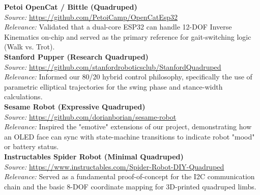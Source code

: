 \documentclass{article}
\begin{document}
\textbf{Petoi OpenCat / Bittle (Quadruped)} \\
\textit{Source:} \url{https://github.com/PetoiCamp/OpenCatEsp32} \\
\textit{Relevance:} Validated that a dual-core ESP32 can handle 12-DOF Inverse Kinematics on-chip and served as the primary reference for gait-switching logic (Walk vs. Trot). \\

\textbf{Stanford Pupper (Research Quadruped)} \\
\textit{Source:} \url{https://github.com/stanfordroboticsclub/StanfordQuadruped} \\
\textit{Relevance:} Informed our 80/20 hybrid control philosophy, specifically the use of parametric elliptical trajectories for the swing phase and stance-width calculations. \\

\textbf{Sesame Robot (Expressive Quadruped)} \\
\textit{Source:} \url{https://github.com/dorianborian/sesame-robot} \\
\textit{Relevance:} Inspired the "emotive" extensions of our project, demonstrating how an OLED face can sync with state-machine transitions to indicate robot "mood" or battery status. \\

\textbf{Instructables Spider Robot (Minimal Quadruped)} \\
\textit{Source:} \url{https://www.instructables.com/Spider-Robot-DIY-Quadruped} \\
\textit{Relevance:} Served as a fundamental proof-of-concept for the I2C communication chain and the basic 8-DOF coordinate mapping for 3D-printed quadruped limbs. \\
\end{document}
